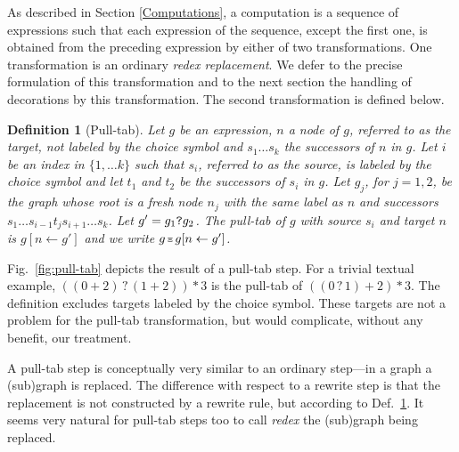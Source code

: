 \documentclass{mytlp}
\renewcommand{\tt}{\usefont{OT1}{cmtt}{m}{n}\selectfont}
\newcommand{\code}[1]{\mbox{\tt #1}}   \newcommand{\bs}{\char92} \newcommand{\us}{\char95}
\newtheorem{definition}{Definition}
\newcommand{\pulltab}{\mbox{\raisebox{.15ex}[0pt][0pt]{\tiny$\Xi$}}}
\begin{document}
As described in Section \ref{Computations}, a computation
is a sequence of expressions such that each expression
of the sequence, except the first one, 
is obtained from the preceding expression by either of two transformations.
One transformation is an ordinary \emph{redex replacement}.
We defer to \cite[Def. 23]{EchahedJanodet98JICSLP} the 
precise formulation of this transformation and
to the next section the handling of decorations by this transformation.
The second transformation is defined below.
\begin{definition}[Pull-tab]
\label{def:pull-tab}
Let $g$ be an expression, $n$ a node of $g$,
referred to as the \emph{target},
not labeled by the choice symbol and 
$s_1\ldots s_k$ the successors of $n$ in $g$.
Let $i$ be an index in $\{1,\ldots k\}$ such that $s_i$,
referred to as the \emph{source},
is labeled by the choice symbol and
let $t_1$ and $t_2$ be the successors of $s_i$ in $g$.
Let $g_j$, for $j=1,2$, be the graph whose root
is a fresh node $n_j$ with the same label as $n$
and successors $s_1\ldots s_{i-1} t_j s_{i+1} \ldots s_k$.
Let $g'=g_1 \code{?} g_2$.
The \emph{pull-tab} of $g$ with source $s_i$ and target $n$ is
$g[n \leftarrow g']$ and we write $g \,\pulltab\, g[n \leftarrow g']$.
\end{definition}
Fig.~\ref{fig:pull-tab} depicts the result of a pull-tab step.
For a trivial textual example,
$((0+2)\,?\,(1+2))*3$ is the pull-tab of
$((0\, ?\, 1) + 2) * 3$.
The definition excludes
targets labeled by the choice symbol.  
These targets are not a problem
for the pull-tab transformation, 
but would complicate, without any benefit,
our treatment.

A pull-tab step is conceptually very similar to
an ordinary step---in a graph a (sub)graph is replaced.
The difference with respect to a rewrite step is that
the replacement is not constructed by a rewrite rule,
but according to Def.~\ref{def:pull-tab}.
It seems very natural for pull-tab steps too
to call \emph{redex} the (sub)graph being replaced.
\end{document}
